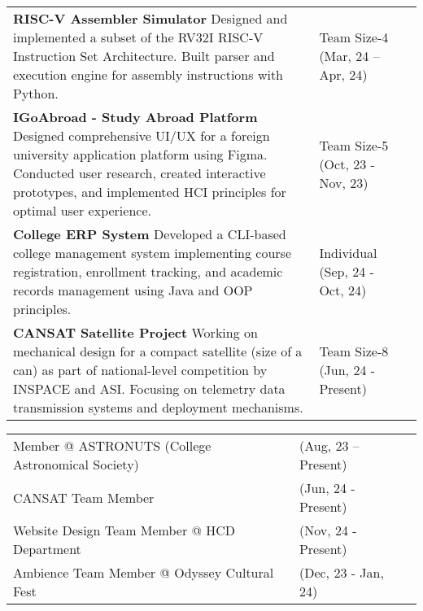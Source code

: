 \documentclass[10pt]{extarticle}
\begin{document}
\begin{contained}
\begin{longtable}{p{}p{}p{}}
    \textbf{RISC-V Assembler Simulator}\newline
    Designed and implemented a subset of the RV32I RISC-V Instruction Set Architecture. Built parser and execution engine for assembly instructions with Python.
    &Team Size-4
    \newline (Mar, 24 – Apr, 24)\\
    \textbf{IGoAbroad - Study Abroad Platform}\newline
    Designed comprehensive UI/UX for a foreign university application platform using Figma. Conducted user research, created interactive prototypes, and implemented HCI principles for optimal user experience.
    &Team Size-5
    \newline (Oct, 23 - Nov, 23)\\
    \textbf{College ERP System}\newline
    Developed a CLI-based college management system implementing course registration, enrollment tracking, and academic records management using Java and OOP principles.
    &Individual
    \newline (Sep, 24 - Oct, 24)\\
    \textbf{CANSAT Satellite Project}\newline
    Working on mechanical design for a compact satellite (size of a can) as part of national-level competition by INSPACE and ASI. Focusing on telemetry data transmission systems and deployment mechanisms.
    &Team Size-8
    \newline (Jun, 24 - Present)
\end{longtable}
\end{contained}

\begin{contained}
\begin{longtable}{p{}p{}p{}}
    Member @ ASTRONUTS (College Astronomical Society) & (Aug, 23 – Present)\\
    CANSAT Team Member & (Jun, 24 - Present)\\
    Website Design Team Member @ HCD Department & (Nov, 24 - Present)\\
    Ambience Team Member @ Odyssey Cultural Fest & (Dec, 23 - Jan, 24)
\end{longtable}
\end{contained}
\end{document}
